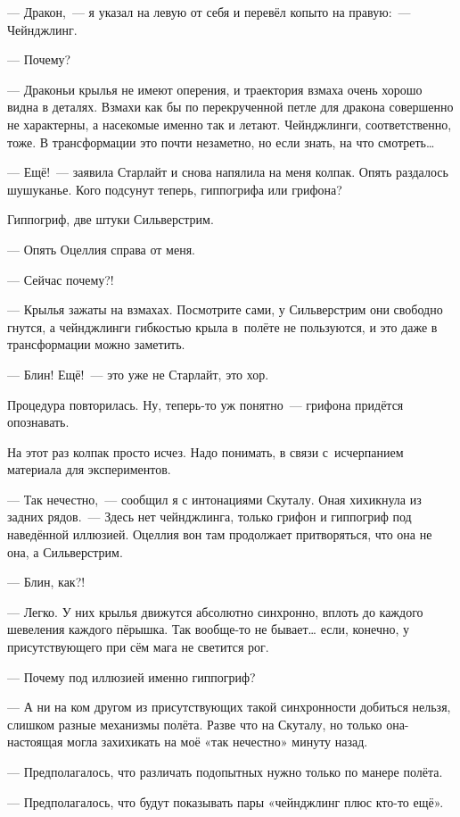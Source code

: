\documentclass[fontsize=11pt,a5paper,titlepage=firstcover]{scrbook}
\begin{document}
--- Дракон,~--- я указал на левую от себя и перевёл копыто на правую:~--- Чейнджлинг.

--- Почему?

--- Драконьи крылья не имеют оперения, и траектория взмаха очень хорошо видна в деталях. Взмахи как бы по перекрученной петле для дракона совершенно не характерны, а насекомые именно так и летают. Чейнджлинги, соответственно, тоже. В трансформации это почти незаметно, но если знать, на что смотреть{\ldots}

--- Ещё!~--- заявила Старлайт и снова напялила на меня колпак. Опять раздалось шушуканье. Кого подсунут теперь, гиппогрифа или грифона?

Гиппогриф, две штуки Сильверстрим.

--- Опять Оцеллия справа от меня.

--- Сейчас почему?!

--- Крылья зажаты на взмахах. Посмотрите сами, у Сильверстрим они свободно гнутся, а чейнджлинги гибкостью крыла в~полёте не пользуются, и это даже в трансформации можно заметить.

--- Блин! Ещё!~--- это уже не Старлайт, это хор.

Процедура повторилась. Ну, теперь-то уж понятно~--- грифона придётся опознавать.

На этот раз колпак просто исчез. Надо понимать, в связи с~исчерпанием материала для экспериментов.

--- Так нечестно,~--- сообщил я с интонациями Скуталу. Оная хихикнула из задних рядов.~--- Здесь нет чейнджлинга, только грифон и гиппогриф под наведённой иллюзией. Оцеллия вон там продолжает притворяться, что она не она, а Сильверстрим.

--- Блин, как?!

--- Легко. У них крылья движутся абсолютно синхронно, вплоть до каждого шевеления каждого пёрышка. Так вообще-то не бывает{\ldots} если, конечно, у присутствующего при сём мага не светится рог.

--- Почему под иллюзией именно гиппогриф?

--- А ни на ком другом из присутствующих такой синхронности добиться нельзя, слишком разные механизмы полёта. Разве что на Скуталу, но только она-настоящая могла захихикать на моё «так нечестно» минуту назад.

--- Предполагалось, что различать подопытных нужно только по манере полёта.

--- Предполагалось, что будут показывать пары «чейнджлинг плюс кто-то ещё».
\end{document}
